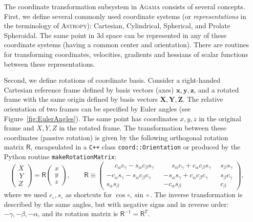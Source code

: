 \documentclass[12pt]{article}
\newcommand{\Agama}{\textsc{Agama}\xspace}
\newcommand{\Cpp}  {\texttt{C++}\xspace}
\newcommand{\bx}{\boldsymbol{x}}
\newcommand{\by}{\boldsymbol{y}}
\newcommand{\bz}{\boldsymbol{z}}
\newcommand{\bX}{\boldsymbol{X}}
\newcommand{\bY}{\boldsymbol{Y}}
\newcommand{\bZ}{\boldsymbol{Z}}
\begin{document}
The coordinate transformation subsystem in \Agama consists of several concepts.
First, we define several commonly used coordinate systems (or \textit{representations} in the terminology of \textsc{Astropy}): Cartesian, Cylindrical, Spherical, and Prolate Spheroidal. The same point in 3d space can be represented in any of these coordinate systems (having a common center and orientation). There are routines for transforming coordinates, velocities, gradients and hessians of scalar functions between these representations.

Second, we define rotations of coordinate basis.
Consider a right-handed Cartesian reference frame defined by basis vectors (axes) $\bx,\by,\bz$, and a rotated frame with the same origin defined by basis vectors $\bX,\bY,\bZ$. The relative orientation of two frames can be specified by Euler angles (see Figure~\ref{fig:EulerAngles}).
The same point has coordinates $x,y,z$ in the original frame and $X,Y,Z$ in the rotated frame.
The transformation between these coordinates (passive rotation) is given by the following orthogonal rotation matrix $\mathsf R$, encapsulated in a \Cpp class \texttt{coord::Orientation} or produced by the Python routine \texttt{makeRotationMatrix}:
\begin{equation}
\left( \begin{array}{c} X \\ \,Y \\ Z \end{array} \right) = \mathsf R 
\left( \begin{array}{c} x \\   y \\ z \end{array} \right) , \qquad
\mathsf R \equiv \left( \begin{array}{ccc}  \phantom{-}
 c_\alpha c_\gamma - s_\alpha c_\beta s_\gamma\;\; & \phantom{-}
 s_\alpha c_\gamma + c_\alpha c_\beta s_\gamma\;\; &
 s_\beta  s_\gamma \\
-c_\alpha s_\gamma - s_\alpha c_\beta c_\gamma\;\; &
-s_\alpha s_\gamma + c_\alpha c_\beta c_\gamma\;\; &
 s_\beta  c_\gamma \\
 s_\alpha s_\beta &
-c_\alpha s_\beta &
 c_\beta 
\end{array} \right) ,
\end{equation}
where we used $c_\circ, s_\circ$ as shortcuts for $\cos\circ, \sin\circ$.
The inverse transformation is described by the same angles, but with negative signs and in reverse order: $-\gamma,-\beta,-\alpha$, and its rotation matrix is $\mathsf R^{-1} = \mathsf R^T$. 
\end{document}
